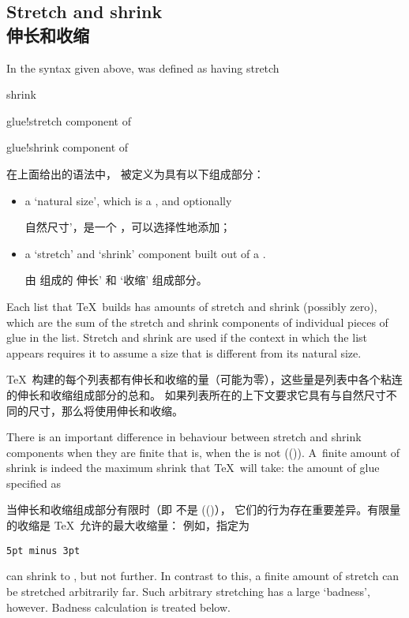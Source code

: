 \subsection{Stretch and shrink\\伸长和收缩}

In the syntax given above,  was defined as having
\term stretch\par\term shrink\par
\term glue!stretch component of\par\term glue!shrink component of\par

在上面给出的语法中， 被定义为具有以下组成部分：
\begin{itemize}\item a `natural size', which is a , and optionally

      自然尺寸'，是一个 ，可以选择性地添加；
\item a `stretch' and `shrink' component built out of a .

由  组成的 伸长' 和 `收缩' 组成部分。
\end{itemize}

Each list that \TeX\ builds has amounts of stretch and shrink
(possibly zero),
which are the sum of the
stretch and shrink components of individual pieces of glue in the list. 
Stretch and shrink are used if the context in which the list
appears requires it to assume a size that is different from
its natural size.

\TeX\ 构建的每个列表都有伸长和收缩的量（可能为零），这些量是列表中各个粘连的伸长和收缩组成部分的总和。
如果列表所在的上下文要求它具有与自然尺寸不同的尺寸，那么将使用伸长和收缩。

There is an important difference in behaviour between stretch
and shrink components when they are finite \ldash that is,
when the  is not (()). 
A~finite amount of shrink is indeed the maximum shrink
that \TeX\ will take: the amount of glue specified
as 

当伸长和收缩组成部分有限时（即  不是 (()），
它们的行为存在重要差异。有限量的收缩是 \TeX\ 允许的最大收缩量：
例如，指定为 
\begin{verbatim}
5pt minus 3pt
\end{verbatim}
can shrink to \n{2pt}, but not further.
In contrast to this, a finite amount of stretch 
can be stretched arbitrarily far. 
Such arbitrary stretching
has a large `badness', however.
Badness calculation is treated below.

